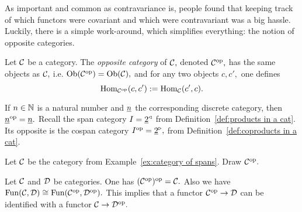 \documentclass[CT4S-EN-RU]{subfiles}
\begin{document}
\begin{blockRUS}
\end{blockRUS}

\begin{blockENG}
As important and common as contravariance is, people found that keeping track of which functors were covariant and which were contravariant was a big hassle. Luckily, there is a simple work-around, which simplifies everything: the notion of opposite categories.
\end{blockENG}

\begin{blockRUS}
\end{blockRUS}

\begin{definitionENG}
Let $\mathcal{C}$ be a category. The {\em opposite category} of $\mathcal{C},$ denoted $\mathcal{C}^\textnormal{op},$ has the same objects as $\mathcal{C},$ i.e. $\textnormal{Ob}(\mathcal{C}^\textnormal{op})=\textnormal{Ob}(\mathcal{C}),$ and for any two objects $c,c',$ one defines
$$\textnormal{Hom}_{\mathcal{C}^\textnormal{op}}(c,c'):=\textnormal{Hom}_\mathcal{C}(c',c).$$
\end{definitionENG}

\begin{definitionRUS}
\end{definitionRUS}

\begin{exampleENG}
If $n\in{\mathbb N}$ is a natural number and $\underline{n}$ the corresponding discrete category, then $\underline{n}^\textnormal{op}=\underline{n}.$ Recall  the span category $I=\underline{2}^\triangleleft$ from Definition~\ref{def:products in a cat}. Its opposite is the cospan category $I^\textnormal{op}=\underline{2}^\triangleright,$ from Definition~\ref{def:coproducts in a cat}.
\end{exampleENG}

\begin{exampleRUS}
\end{exampleRUS}

\begin{exerciseENG}
Let $\mathcal{C}$ be the category from Example~\ref{ex:category of spans}. Draw $\mathcal{C}^\textnormal{op}.$
\end{exerciseENG}

\begin{exerciseRUS}
\end{exerciseRUS}

\begin{lemmaENG}
Let $\mathcal{C}$ and $\mathcal{D}$ be categories. One has $(\mathcal{C}^\textnormal{op})^\textnormal{op}=\mathcal{C}.$ Also we have $\textnormal{Fun}(\mathcal{C},\mathcal{D})\cong\textnormal{Fun}(\mathcal{C}^\textnormal{op},\mathcal{D}^\textnormal{op}).$ This implies that a functor $\mathcal{C}^\textnormal{op}\rightarrow\mathcal{D}$ can be identified with a functor $\mathcal{C}\rightarrow\mathcal{D}^\textnormal{op}.$
\end{lemmaENG}
\end{document}
